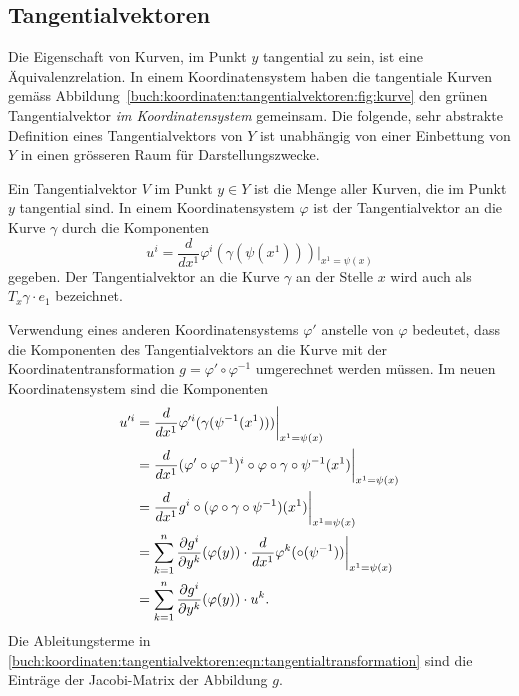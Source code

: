 \subsection{Tangentialvektoren}
Die Eigenschaft von Kurven, im Punkt $y$ tangential zu sein, ist
eine Äquivalenzrelation.
In einem Koordinatensystem haben die tangentiale Kurven gemäss
Abbildung~\ref{buch:koordinaten:tangentialvektoren:fig:kurve}
den grünen Tangentialvektor {\em im Koordinatensystem} gemeinsam.
Die folgende, sehr abstrakte Definition eines Tangentialvektors
von $Y$ ist unabhängig von einer Einbettung von $Y$ in einen
grösseren Raum für Darstellungszwecke.

\begin{definition}[Tangentialvektor]
\label{buch:koordinaten:tangentialvektoren:def:tangentialvektor}
Ein Tangentialvektor $V$ im Punkt $y\in Y$ ist die Menge aller Kurven, die
im Punkt $y$ tangential sind.
In einem Koordinatensystem $\varphi$ ist der Tangentialvektor an die Kurve
$\gamma$ durch die Komponenten
\[
u^i
=
\frac{d}{dx^1} \varphi^i(\gamma(\psi(x^1))) \bigg|_{x^1 = \psi(x)}
\]
gegeben.
Der Tangentialvektor an die Kurve $\gamma$ an der Stelle $x$
wird auch als $T_x\gamma\cdot e_1$ bezeichnet.
\end{definition}

Verwendung eines anderen Koordinatensystems $\varphi'$ anstelle von
$\varphi$ bedeutet, dass die Komponenten des Tangentialvektors
an die Kurve mit der Koordinatentransformation
$g=\varphi'\circ\varphi^{-1}$ umgerechnet werden müssen.
Im neuen Koordinatensystem sind die Komponenten
\begin{align}
u^{\prime i}
&=
\frac{d}{dx^1}
\varphi^{\prime i}(\gamma(\psi^{-1}(x^1))) \bigg|_{x^1=\psi(x)}
\notag
\\
&=
\frac{d}{dx^1}
(\varphi'\circ\varphi^{-1})^i\circ \varphi\circ\gamma\circ\psi^{-1}(x^1)
\bigg|_{x^1=\psi(x)}
\notag
\\
&=
\frac{d}{dx^1} g^i\circ(\varphi\circ\gamma\circ\psi^{-1})(x^1)
\bigg|_{x^1=\psi(x)}
\notag
\\
&=
\sum_{k=1}^n
\frac{\partial g^i}{\partial y^k}(\varphi(y))
\cdot
\frac{d}{dx^1}\varphi^k(\circ(\psi^{-1})) 
\bigg|_{x^1=\psi(x)}
\notag
\\
&=
\sum_{k=1}^n
\frac{\partial g^i}{\partial y^k}(\varphi(y))
\cdot
u^k.
\label{buch:koordinaten:tangentialvektoren:eqn:tangentialtransformation}
\end{align}
Die Ableitungsterme in
\eqref{buch:koordinaten:tangentialvektoren:eqn:tangentialtransformation}
sind die Einträge der Jacobi-Matrix der Abbildung $g$.

